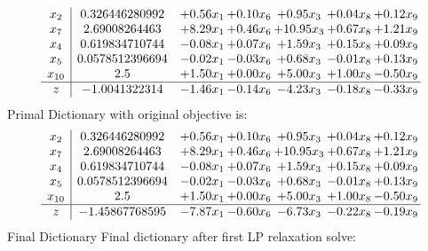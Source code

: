 \documentclass[8pt]{article}
\begin{document}
\[\begin{array}{c| c c@{\hskip 2pt} c@{\hskip 2pt} c@{\hskip 2pt} c@{\hskip 2pt} c@{\hskip 2pt} }
 x_{2}   &  0.326446280992 & +  0.56 x_{1} & +  0.10 x_{6} & +  0.95 x_{3} & +  0.04 x_{8} & +  0.12 x_{9}\\
 x_{7}   &  2.69008264463 & +  8.29 x_{1} & +  0.46 x_{6} & + 10.95 x_{3} & +  0.67 x_{8} & +  1.21 x_{9}\\
 x_{4}   &  0.619834710744 & -0.08 x_{1} & +  0.07 x_{6} & +  1.59 x_{3} & +  0.15 x_{8} & +  0.09 x_{9}\\
 x_{5}   &  0.0578512396694 & -0.02 x_{1} & -0.03 x_{6} & +  0.68 x_{3} & -0.01 x_{8} & +  0.13 x_{9}\\
 x_{10}   &  2.5 & +  1.50 x_{1} & +  0.00 x_{6} & +  5.00 x_{3} & +  1.00 x_{8} & -0.50 x_{9}\\
\hline
z    &  -1.0041322314 & -1.46 x_{1} & -0.14 x_{6} & -4.23 x_{3} & -0.18 x_{8} & -0.33 x_{9}\\
\end{array}\]
Primal Dictionary with original objective is:
\[\begin{array}{c| c c@{\hskip 2pt} c@{\hskip 2pt} c@{\hskip 2pt} c@{\hskip 2pt} c@{\hskip 2pt} }
 x_{2}   &  0.326446280992 & +  0.56 x_{1} & +  0.10 x_{6} & +  0.95 x_{3} & +  0.04 x_{8} & +  0.12 x_{9}\\
 x_{7}   &  2.69008264463 & +  8.29 x_{1} & +  0.46 x_{6} & + 10.95 x_{3} & +  0.67 x_{8} & +  1.21 x_{9}\\
 x_{4}   &  0.619834710744 & -0.08 x_{1} & +  0.07 x_{6} & +  1.59 x_{3} & +  0.15 x_{8} & +  0.09 x_{9}\\
 x_{5}   &  0.0578512396694 & -0.02 x_{1} & -0.03 x_{6} & +  0.68 x_{3} & -0.01 x_{8} & +  0.13 x_{9}\\
 x_{10}   &  2.5 & +  1.50 x_{1} & +  0.00 x_{6} & +  5.00 x_{3} & +  1.00 x_{8} & -0.50 x_{9}\\
\hline
z    &  -1.45867768595 & -7.87 x_{1} & -0.60 x_{6} & -6.73 x_{3} & -0.22 x_{8} & -0.19 x_{9}\\
\end{array}\]
Final Dictionary
Final dictionary after first LP relaxation solve: 
\end{document}
